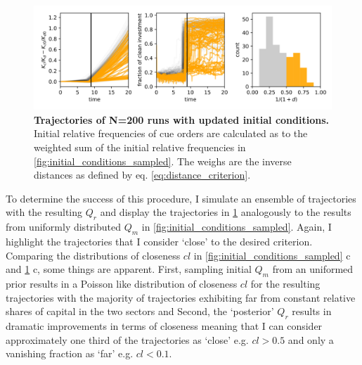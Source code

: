 \begin{figure}[t]
  \centering
  \includegraphics[width= \textwidth]{figures/initial_condition_fitted.png}
  \caption[Trajectories of N=200 runs with updated initial conditions]{\textbf{Trajectories of N=200 runs with updated initial conditions.} Initial relative frequencies of cue orders are calculated as to the weighted sum of the initial relative frequencies in \cref{fig:initial_conditions_sampled}. The weighs are the inverse distances as defined by eq. \ref{eq:distance_criterion}.}
  \label{fig:initial_conditions_fitted}
\end{figure}

To determine the success of this procedure, I simulate an ensemble of trajectories with the resulting $Q_r$ and display the trajectories in \cref{fig:initial_conditions_fitted} analogously to the results from uniformly distributed $Q_m$ in \cref{fig:initial_conditions_sampled}. Again, I highlight the trajectories that I consider `close' to the desired criterion. Comparing the distributions of closeness $cl$ in \cref{fig:initial_conditions_sampled} c and \cref{fig:initial_conditions_fitted} c, some things are apparent. First, sampling initial $Q_m$ from an uniformed prior results in a Poisson like distribution of closeness $cl$ for the resulting trajectories with the majority of trajectories exhibiting far from constant relative shares of capital in the two sectors and Second, the `posterior' $Q_r$ results in dramatic improvements in terms of closeness meaning that I can consider approximately one third of the trajectories as `close' e.g. $cl>0.5$ and only a vanishing fraction as `far' e.g. $cl<0.1$.\\



